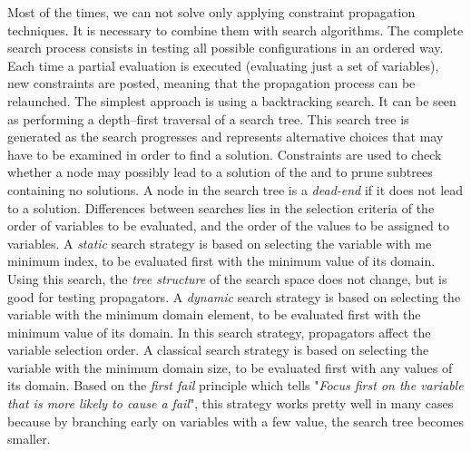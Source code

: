 Most of the times, we can not solve \csps{} only applying constraint propagation techniques. It is necessary to combine them with search algorithms. The complete search process consists in testing all possible configurations in an ordered way. Each time a partial evaluation is executed (evaluating just a set of variables), new constraints are posted, meaning that the propagation process can be relaunched. The simplest approach is using a backtracking search. It can be seen as performing a depth--first traversal of a search tree. This search tree is generated as the search progresses and represents alternative choices that may have to be examined in order to find a solution. Constraints are used to check whether a node may possibly lead to a solution of the \csp{} and to prune subtrees containing no solutions. A node in the search
tree is a \textit{dead-end} if it does not lead to a solution. Differences between searches lies in the selection criteria of the order of variables to be evaluated, and the order of the values to be assigned to variables. A \textit{static} search strategy is based on selecting the variable with me minimum index, to be evaluated first with the minimum value of its domain. Using this search, the \textit{tree structure} of the search space does not change, but is good for testing propagators. A \textit{dynamic} search strategy is based on selecting the variable with the minimum domain element, to be evaluated first with the minimum value of its domain. In this search strategy, propagators affect the variable selection order. A classical search strategy is based on selecting the variable with the minimum domain size, to be evaluated first with any values of its domain. Based on the \textit{first fail} principle which tells "\textit{Focus first on the variable that is more likely to cause a fail}",  this strategy works pretty well in many cases because by branching early on variables with a few value, the search tree becomes smaller.

